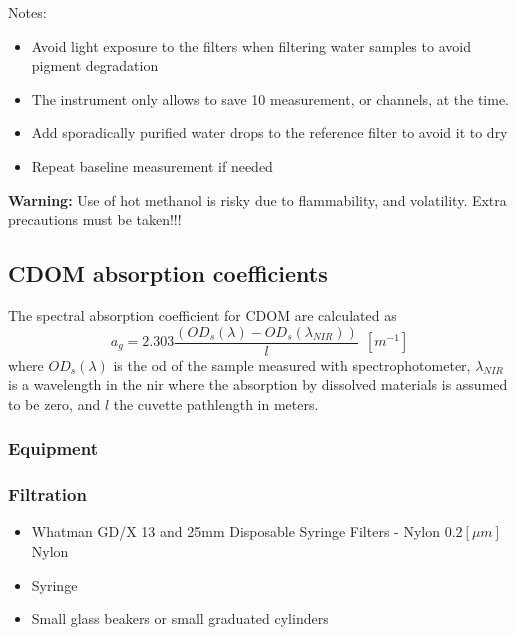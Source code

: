 \begin{appendices}
Notes:
\begin{itemize}[itemsep=2pt,parsep=2pt]
  \item Avoid light exposure to the filters when filtering water samples to avoid pigment degradation
  \item The instrument only allows to save 10 measurement, or channels, at the time. 
  \item Add sporadically purified water drops to the reference filter to avoid it to dry
  \item Repeat baseline measurement if needed
\end{itemize}  
{\bf Warning:}  Use of hot methanol is risky due to flammability, and volatility. Extra precautions must be taken!!!


\subsection{CDOM absorption coefficients}
The spectral absorption coefficient for CDOM are calculated as \citep{Mitchell2002}
\begin{equation}
  a_g=2.303 \frac{(OD_s(\lambda)-OD_s(\lambda_{NIR}))}{l}~~[m^{-1}]
\end{equation}
\noindent where $OD_s(\lambda)$ is the \gls{od} of the sample measured with spectrophotometer, $\lambda_{NIR}$ is a wavelength in the \gls{nir} where the absorption by dissolved materials is assumed to be zero, and $l$ the cuvette pathlength in meters.

\subsubsection{Equipment}
\subsubsection*{Filtration}
\begin{itemize}[itemsep=2pt,parsep=2pt]
  \item Whatman GD/X 13 and 25mm Disposable Syringe Filters - Nylon $0.2[\mu m]$ Nylon
  \item Syringe
  \item Small glass beakers or small graduated cylinders
\end{itemize}

\end{appendices}
